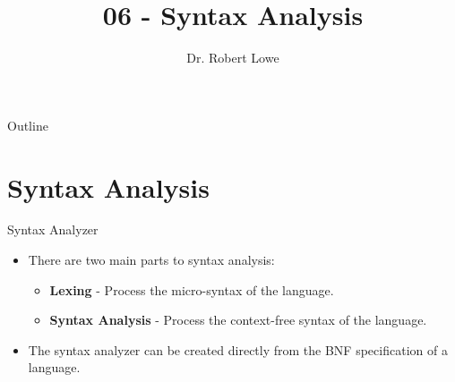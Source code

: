 \documentclass[]{beamer}
\title{06 - Syntax Analysis}
\author{Dr. Robert Lowe\\}
\institute[Maryville College] %
{
  Division of Mathematics and Computer Science\\
  Maryville College
}
\date[]{}
\begin{document}
\begin{frame}
  \titlepage
\end{frame}

\begin{frame}{Outline}
  \tableofcontents
\end{frame}





\section{Syntax Analysis}

\begin{frame}{Syntax Analyzer}
    \begin{itemize}[<+->]
        \item There are two main parts to syntax analysis:
        \begin{itemize}
            \item \textbf{Lexing} - Process the micro-syntax of the
                language. 
            \item \textbf{Syntax Analysis} - Process the context-free
                syntax of the language.
        \end{itemize}
        \item The syntax analyzer can be created directly from the BNF
            specification of a language.
    \end{itemize}
\end{frame}
\end{document}
